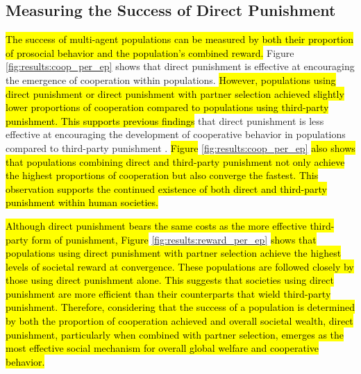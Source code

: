 \documentclass[sn-aps,numbered]{sn-jnl}%
\theoremstyle{thmstyleone}%
\theoremstyle{thmstyletwo}%
\theoremstyle{thmstylethree}%
\begin{document}
\noindent \subsection{Measuring the Success of Direct Punishment}

\hl{The success of multi-agent populations can be measured by both their proportion of prosocial behavior and the population's combined reward.} Figure \ref{fig:results:coop_per_ep} shows that direct punishment is effective at encouraging the emergence of cooperation within populations. \hl{However, populations using direct punishment or direct punishment with partner selection achieved slightly lower proportions of cooperation compared to populations using third-party punishment. This supports previous findings} that direct punishment is less effective at encouraging the development of cooperative behavior in populations compared to third-party punishment \citep{Redhead2021, coop_sizes_punish_partner_choice_rep, boyd1992punishment, tpp_4_year_olds}. \hl{Figure} \ref{fig:results:coop_per_ep} \hl{also shows that populations combining direct and third-party punishment not only achieve the highest proportions of cooperation but also converge the fastest. This observation supports the continued existence of both direct and third-party punishment within human societies.} 

\hl{Although direct punishment bears the same costs as the more effective third-party form of punishment, Figure} \ref{fig:results:reward_per_ep} \hl{shows that populations using direct punishment with partner selection achieve the highest levels of societal reward at convergence. These populations are followed closely by those using direct punishment alone. This suggests that societies using direct punishment are more efficient than their counterparts that wield third-party punishment. Therefore, considering that the success of a population is determined by both the proportion of cooperation achieved and overall societal wealth, direct punishment, particularly when combined with partner selection, emerges as the most effective social mechanism for overall global welfare and cooperative behavior.}
\end{document}
